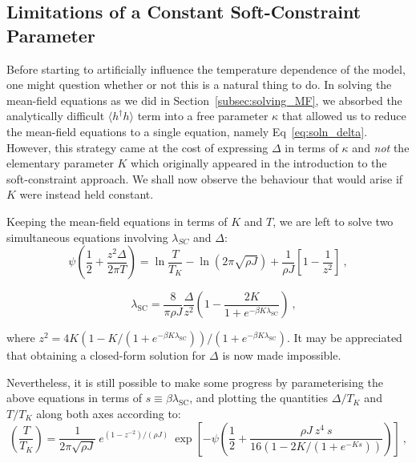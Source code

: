 \documentclass[12pt]{article}
\begin{document}


\subsection{Limitations of a Constant Soft-Constraint Parameter}

Before starting to artificially influence the temperature dependence of the model, one might question whether or not this is a natural thing to do. In solving the mean-field equations as we did in Section~\ref{subsec:solving_MF}, we absorbed the analytically difficult $ \langle h^{\dagger} h \rangle $ term into a free parameter $ \kappa $ that allowed us to reduce the mean-field equations to a single equation, namely Eq~\eqref{eq:soln_delta}. However, this strategy came at the cost of expressing $ \Delta $ in terms of $ \kappa $ and \emph{not} the elementary parameter $ K $ which originally appeared in the introduction to the soft-constraint approach. We shall now observe the behaviour that would arise if $ K $ were instead held constant.

Keeping the mean-field equations in terms of $ K $ and $ T $, we are left to solve two simultaneous equations involving $ \lambda_{SC} $ and $ \Delta $:
\begin{equation}
\psi \left( \frac{1}{2} + \frac{z^2 \Delta}{2 \pi T} \right) = \ln{\frac{T}{T_K}} - \ln{\left( 2 \pi \sqrt{\rho J} \right)} + \frac{1}{\rho J} \left[ 1 - \frac{1}{z^2} \right] ~ ,
\end{equation}

\begin{equation}
\quad \lambda_{\text{SC}} = \frac{8}{\pi \rho J} \frac{\Delta}{z^2} \left( 1 - \frac{2 K}{1 + e^{- \beta K \lambda_{\text{SC}}}} \right) ~ ,
\end{equation}

where $ z^2 = 4 K \left( 1 - K / (1 + e^{- \beta K \lambda_{\text{SC}}}) \right) / \left({1 + e^{- \beta K \lambda_{\text{SC}}}} \right) $. It may be appreciated that obtaining a closed-form solution for $ \Delta $ is now made impossible.

Nevertheless, it is still possible to make some progress by parameterising the above equations in terms of $ s \equiv \beta \lambda_{\text{SC}} $, and plotting the quantities $ \Delta / T_K $ and $ T / T_K $ along both axes according to:
\begin{equation}
\left( \frac{T}{T_K} \right) = \frac{1}{2 \pi \sqrt{\rho J}} ~ e^{(1 - z^{-2}) / (\rho J)} ~ \exp{\left[- \psi \left( \frac{1}{2} + \frac{\rho J ~ z^4 ~ s}{16 (1 - 2 K / (1 + e^{- K s}))} \right) \right]} ~ ,
\label{eq:parametric_T}
\end{equation}
\end{document}
